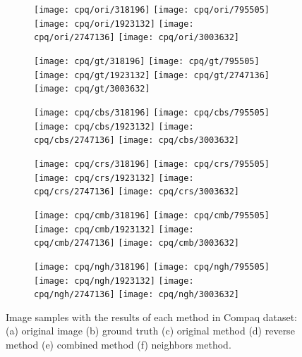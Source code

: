 \begin{figure}[!htb]
    \centering
    \begin{subfigure}[t]{0.15\textwidth}
        \texttt{[image: cpq/ori/318196]}
        \texttt{[image: cpq/ori/795505]}
        \texttt{[image: cpq/ori/1923132]}
        \texttt{[image: cpq/ori/2747136]}
        \texttt{[image: cpq/ori/3003632]}
        \caption{}
    \end{subfigure}
    \begin{subfigure}[t]{0.15\textwidth}
        \texttt{[image: cpq/gt/318196]}
        \texttt{[image: cpq/gt/795505]}
        \texttt{[image: cpq/gt/1923132]}
        \texttt{[image: cpq/gt/2747136]}
        \texttt{[image: cpq/gt/3003632]}
        \caption{}
    \end{subfigure}
    \begin{subfigure}[t]{0.15\textwidth}
        \texttt{[image: cpq/cbs/318196]}
        \texttt{[image: cpq/cbs/795505]}
        \texttt{[image: cpq/cbs/1923132]}
        \texttt{[image: cpq/cbs/2747136]}
        \texttt{[image: cpq/cbs/3003632]}
        \caption{}
    \end{subfigure}
    \begin{subfigure}[t]{0.15\textwidth}
        \texttt{[image: cpq/crs/318196]}
        \texttt{[image: cpq/crs/795505]}
        \texttt{[image: cpq/crs/1923132]}
        \texttt{[image: cpq/crs/2747136]}
        \texttt{[image: cpq/crs/3003632]}
        \caption{}
    \end{subfigure}
    \begin{subfigure}[t]{0.15\textwidth}
        \texttt{[image: cpq/cmb/318196]}
        \texttt{[image: cpq/cmb/795505]}
        \texttt{[image: cpq/cmb/1923132]}
        \texttt{[image: cpq/cmb/2747136]}
        \texttt{[image: cpq/cmb/3003632]}
        \caption{}
    \end{subfigure}
    \begin{subfigure}[t]{0.15\textwidth}
        \texttt{[image: cpq/ngh/318196]}
        \texttt{[image: cpq/ngh/795505]}
        \texttt{[image: cpq/ngh/1923132]}
        \texttt{[image: cpq/ngh/2747136]}
        \texttt{[image: cpq/ngh/3003632]}
        \caption{}
    \end{subfigure}

    \caption[Image samples with the results of each method in Compaq dataset]{Image samples with the results of each method in Compaq dataset: (a) original image (b) ground truth (c) original method \cite{brancati:17} (d) reverse method (e) combined method (f) neighbors method.}
    \label{fig:results_cpq}
\end{figure}
\clearpage

